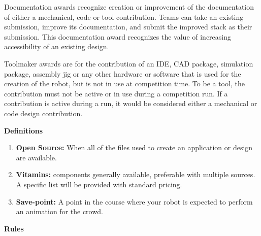 \documentclass{article}
\begin{document}
  Documentation awards recognize creation or improvement of the documentation of either a mechanical, code or tool contribution. Teams can take an existing  submission, improve its documentation, and submit the improved stack as their submission. This documentation award recognizes the value of increasing accessibility of an existing design. 
  
  Toolmaker awards are for the contribution of an IDE, CAD package, simulation package, assembly jig or any other hardware or software that is used for the creation of the robot, but is not in use at competition time. To be a tool, the contribution must not be active or in use during a competition run. If a contribution is active during a run, it would be considered either a mechanical or code design contribution. 
 
 \pagebreak
 
{\huge \textbf{Definitions}}
\begin{enumerate}
	\item \textbf{Open Source:} When all of the files used to create an application or design are available.
	\item \textbf{Vitamins:} components generally available, preferable with multiple sources. A specific list will be provided with standard pricing.
	\item \textbf{Save-point:} A point in the course where your robot is expected to perform an animation for the crowd.  
\end{enumerate}

  \pagebreak
{\huge \textbf{Rules}}
\end{document}
